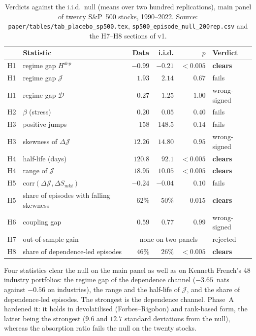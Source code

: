 \documentclass[11pt]{article}
\theoremstyle{definition}
\theoremstyle{remark}
\newcommand{\JJ}{\mathcal{J}}
\newcommand{\DD}{\mathcal{D}}
\begin{document}
\begin{table}[htbp]
\centering
\small
\begin{tabular}{@{}llrrrl@{}}
\toprule
& Statistic & Data & i.i.d. & $p$ & Verdict \\
\midrule
H1 & regime gap $H^{dep}$ & $-0.99$ & $-0.21$ & $<0.005$ & \textbf{clears} \\
H1 & regime gap $\JJ$ & $1.93$ & $2.14$ & $0.67$ & fails \\
H1 & regime gap $\DD$ & $0.27$ & $1.25$ & $1.00$ & wrong-signed \\
H2 & $\beta$ (stress) & $0.20$ & $0.05$ & $0.40$ & fails \\
H3 & positive jumps & $158$ & $148.5$ & $0.14$ & fails \\
H3 & skewness of $\Delta\JJ$ & $12.26$ & $14.80$ & $0.95$ & wrong-signed \\
H4 & half-life (days) & $120.8$ & $92.1$ & $<0.005$ & \textbf{clears} \\
H4 & range of $\JJ$ & $18.95$ & $10.05$ & $<0.005$ & \textbf{clears} \\
H5 & $\mathrm{corr}(\Delta\JJ,\Delta S_{mkt})$ & $-0.24$ & $-0.04$ & $0.10$ & fails \\
H5 & share of episodes with falling skewness & $62\%$ & $50\%$ & $0.015$ & \textbf{clears} \\
H6 & coupling gap & $0.59$ & $0.77$ & $0.99$ & wrong-signed \\
H7 & out-of-sample gain & \multicolumn{3}{c}{none on two panels} & rejected \\
H8 & share of dependence-led episodes & $46\%$ & $26\%$ & $<0.005$ & \textbf{clears} \\
\bottomrule
\end{tabular}
\caption{Verdicts against the i.i.d.\ null (means over two hundred replications),
main panel of twenty S\&P~500 stocks, 1990--2022. Source:
\texttt{paper/tables/tab\_placebo\_sp500.tex}, \texttt{sp500\_episode\_null\_200rep.csv}
and the H7--H8 sections of v1.}
\label{tab:program}
\end{table}

Four statistics clear the null on the main panel as well as on Kenneth
French's 48 industry portfolios: the regime gap of the dependence channel
($-3.65$~nats against $-0.56$ on industries), the range and the half-life of
$\JJ$, and the share of dependence-led episodes. The strongest is the
dependence channel. Phase~A hardened it: it holds in devolatilised
(Forbes--Rigobon) and rank-based form, the latter being the strongest ($9.6$
and $12.7$ standard deviations from the null), whereas the
\citet{kritzman2011} absorption ratio fails the null on the twenty stocks.
\end{document}
